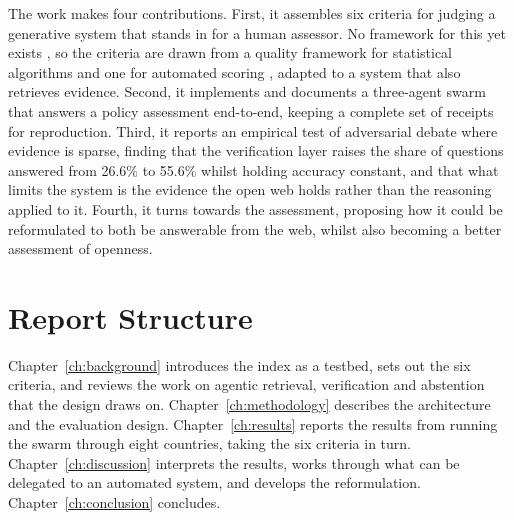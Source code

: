 The work makes four contributions. First, it assembles six criteria for judging a generative system that stands in for a human assessor. No framework for this yet exists \citep{unece2025}, so the criteria are drawn from a quality framework for statistical algorithms \citep{yung2022} and one for automated scoring \citep{williamson2012}, adapted to a system that also retrieves evidence. Second, it implements and documents a three-agent swarm that answers a policy assessment end-to-end, keeping a complete set of receipts for reproduction. Third, it reports an empirical test of adversarial debate where evidence is sparse, finding that the verification layer raises the share of questions answered from 26.6\% to 55.6\% whilst holding accuracy constant, and that what limits the system is the evidence the open web holds rather than the reasoning applied to it. Fourth, it turns towards the assessment, proposing how it could be reformulated to both be answerable from the web, whilst also becoming a better assessment of openness.

\section{Report Structure}\label{sec:report-structure}

Chapter~\ref{ch:background} introduces the index as a testbed, sets out the six criteria, and reviews the work on agentic retrieval, verification and abstention that the design draws on. Chapter~\ref{ch:methodology} describes the architecture and the evaluation design. Chapter~\ref{ch:results} reports the results from running the swarm through eight countries, taking the six criteria in turn. Chapter~\ref{ch:discussion} interprets the results, works through what can be delegated to an automated system, and develops the reformulation. Chapter~\ref{ch:conclusion} concludes.
